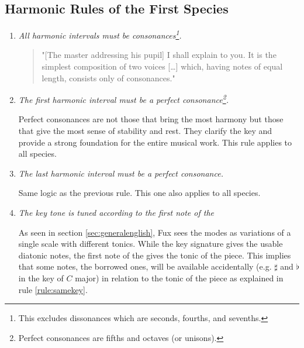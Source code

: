 \subsection{Harmonic Rules of the First Species}
\begin{enumerate}[wide, label=\bfseries 1.H\arabic*]
    \item\label{rule:allcons} \textit{All harmonic intervals must be consonances\footnote{This excludes dissonances which are seconds, fourths, and sevenths.}.} \textcite[p.53]{GaPFr}

    \begin{quotation}
        "[The master addressing his pupil] I shall explain to you. It is the simplest composition of two voices [\dots] which, having notes of equal length, consists only of consonances."
        \textcite[p.27]{GaPEng}
    \end{quotation}

    \item\label{rule:firstpcons} \textit{The first harmonic interval must be a perfect consonance\footnote{Perfect consonances are fifths and octaves (or unisons).}.} \parencite[p.54]{GaPFr}

    Perfect consonances are not those that bring the most harmony but those that give the most sense of stability and rest. They clarify the key and provide a strong foundation for the entire musical work. This rule applies to all species.

    \item\label{rule:lastpcons} \textit{The last harmonic interval must be a perfect consonance.} \parencite[p.54]{GaPFr}

    Same logic as the previous rule. This one also applies to all species.

    \item\label{rule:keytone} \textit{The key tone is tuned according to the first note of the \cfdot} \parencite[p.56]{GaPFr}

    As seen in section \ref{sec:generalenglish}, Fux sees the modes as variations of a single scale with different tonics. While the key signature gives the usable diatonic notes, the first note of the \cf gives the tonic of the piece. This implies that some notes, the borrowed ones, will be available accidentally (e.g. $\sharp$ and $\flat$ in the key of $C$ major) in relation to the tonic of the piece as explained in rule \ref{rule:samekey}.


\end{enumerate}
